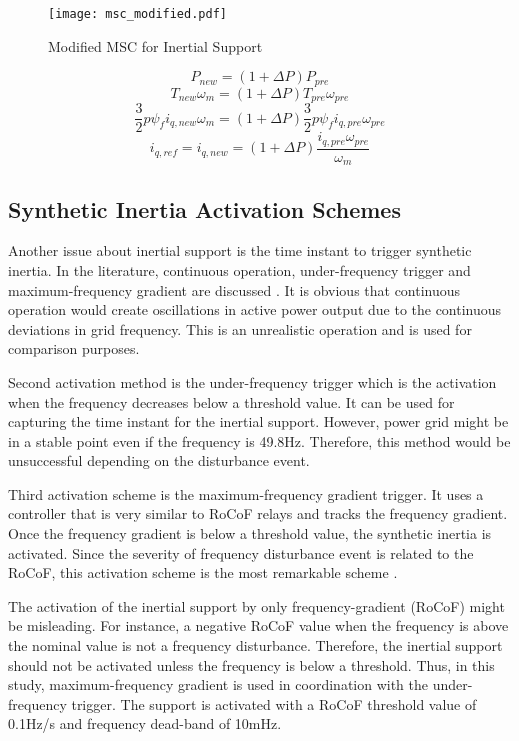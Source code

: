 \begin{figure}[h!]
	\centering
	\texttt{[image: msc\_modified.pdf]}
	\caption{Modified MSC for Inertial Support}
	\label{modifiedmsc}
\end{figure}
\begin{equation}
P_{new}=(1+\Delta P) P_{pre}
\label{inertialsupport1}
\end{equation}
\begin{equation}
T_{new} \omega_{m}=(1+\Delta P) T_{pre} \omega_{pre}
\label{inertialsupport2}
\end{equation}
\begin{equation}
\frac{3}{2} p \psi_{f} i_{q,new} \omega_{m}=(1+\Delta P) \frac{3}{2} p \psi_{f} i_{q,pre} \omega_{pre}
\label{inertialsupport3}
\end{equation}
\begin{equation}
 i_{q,ref}=i_{q,new}=(1+\Delta P) \frac{i_{q,pre} \omega_{pre}}{ \omega_{m}} 
\label{inertialsupport4}
\end{equation}
\subsection{Synthetic Inertia Activation Schemes}
Another issue about inertial support is the time instant to trigger synthetic inertia. In the literature, continuous operation, under-frequency trigger and maximum-frequency gradient are discussed \cite{Gonzalez-longatt2015}. It is obvious that continuous operation would create oscillations in active power output due to the continuous deviations in grid frequency. This is an unrealistic operation and is used for comparison purposes.\par
Second activation method is the under-frequency trigger which is the activation when the frequency decreases below a threshold value. It can be used for capturing the time instant for the inertial support. However, power grid might be in a stable point even if the frequency is 49.8Hz. Therefore, this method would be unsuccessful depending on the disturbance event. \par 
Third activation scheme is the maximum-frequency gradient trigger. It uses a controller that is very similar to RoCoF relays and tracks the frequency gradient. Once the frequency gradient is below a threshold value, the synthetic inertia is activated. Since the severity of frequency disturbance event is related to the RoCoF, this activation scheme is the most remarkable scheme \cite{Gonzalez-longatt2015}. \par The activation of the inertial support by only frequency-gradient (RoCoF) might be misleading. For instance, a negative RoCoF value when the frequency is above the nominal value is not a frequency disturbance. Therefore, the inertial support should not be activated unless the frequency is below a threshold. Thus, in this study, maximum-frequency gradient is used in coordination with the under-frequency trigger. The support is activated with a RoCoF threshold value of 0.1Hz/s and frequency dead-band of 10mHz.
